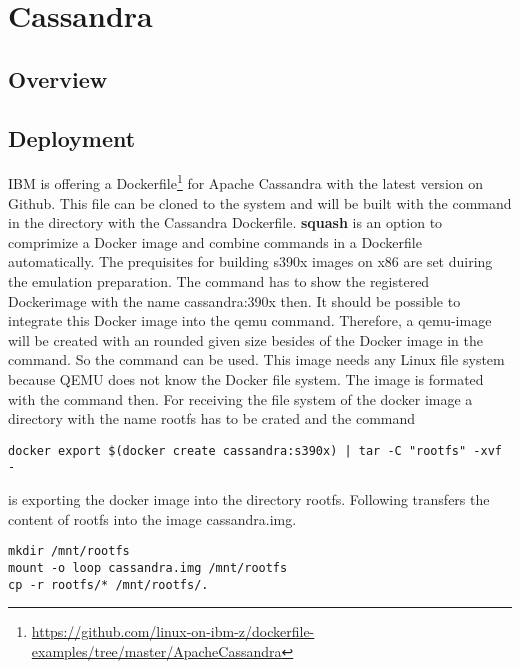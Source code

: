 \chapter{Cassandra}\label{ch:cassandra}

\section{Overview}

\section{Deployment}

IBM is offering a Dockerfile\footnote{\url{https://github.com/linux-on-ibm-z/dockerfile-examples/tree/master/ApacheCassandra}} for Apache Cassandra with the latest version on Github. This file can be cloned to the system and will be built with the command  in the directory with the Cassandra Dockerfile. \textbf{squash} is an option to comprimize a Docker image and combine commands in a Dockerfile automatically. The prequisites for building s390x images on x86 are set duiring the emulation preparation. The command  has to show the registered Dockerimage with the name cassandra:390x then. It should be possible to integrate this Docker image into the qemu command. Therefore, a qemu-image will be created with an rounded given size besides of the Docker image in the  command. So the command  can be used. This image needs any Linux file system because QEMU does not know the Docker file system. The image is formated with the command  then. For receiving the file system of the docker image a directory with the name rootfs has to be crated and the command
\begin{lstlisting}[style=BashInputStyle]
docker export $(docker create cassandra:s390x) | tar -C "rootfs" -xvf -
 \end{lstlisting}
 is exporting the docker image into the directory rootfs. Following transfers the content of rootfs into the image cassandra.img.

\begin{lstlisting}[style=BashInputStyle]
mkdir /mnt/rootfs
mount -o loop cassandra.img /mnt/rootfs
cp -r rootfs/* /mnt/rootfs/.
 \end{lstlisting}

